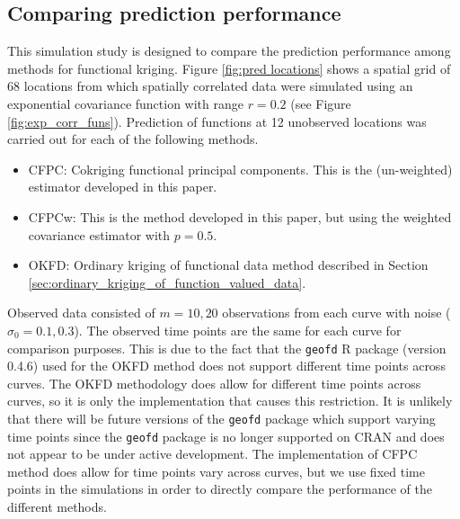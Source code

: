 
\subsection{Comparing prediction performance} %
\label{sub:comparing_prediction_performance}
This simulation study is designed to compare the prediction performance among methods for functional kriging. Figure \ref{fig:pred locations} shows a spatial grid of 68 locations from which spatially correlated data were simulated using an exponential covariance function with range $r = 0.2$ (see Figure \ref{fig:exp_corr_funs}). Prediction of functions at 12 unobserved locations was carried out for each of the following methods.
\begin{itemize}
	\item CFPC: Cokriging functional principal components. This is the (un-weighted) estimator developed in this paper.
	\item CFPCw: This is the method developed in this paper, but using the weighted covariance estimator with $p=0.5$.
	\item OKFD: Ordinary kriging of functional data method described in Section \ref{sec:ordinary_kriging_of_function_valued_data}.
\end{itemize}

Observed data consisted of $m = 10, 20$ observations from each curve with noise ($\sigma_0=0.1, 0.3$). The observed time points are the same for each curve for comparison purposes. This is due to the fact that the \texttt{geofd} R package (version 0.4.6) used for the OKFD method does not support different time points across curves. The OKFD methodology does allow for different time points across curves, so it is only the implementation that causes this restriction. It is unlikely that there will be future versions of the \texttt{geofd} package which support varying time points since the \texttt{geofd} package is no longer supported on CRAN and does not appear to be under active development. The implementation of CFPC method does allow for time points vary across curves, but we use fixed time points in the simulations in order to directly compare the performance of the different methods.                                              

